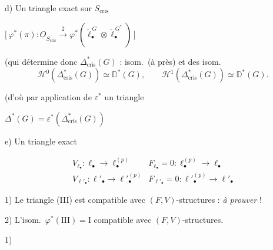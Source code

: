 \documentclass[11pt,a4paper]{article}
\begin{document}
d)  Un triangle exact sur $S_{\mathrm{cris}}$


\qquad
$\bigl[\,\varphi^*(\pi)\colon \underline{O}_{S_{\mathrm{cris}}} \xrightarrow{\ 2\ }
\varphi^*(\check{\ell}^{\,G}_\bullet \otimes \check{\ell}^{\,G^*}_\bullet)\,\bigr]$

(qui détermine donc $\Delta^*_{\mathrm{cris}}(G)$ : isom.\ (à  près) et des isom.
\[
\mathcal{H}^0(\Delta^*_{\mathrm{cris}}(G)) \simeq \mathbb{D}^*(G), \qquad
\mathcal{H}^1(\Delta^*_{\mathrm{cris}}(G)) \simeq \mathbb{D}^*(G) .
\]

(d'où par application de $\varepsilon^*$ un triangle


\qquad $\Delta^*(G) = \varepsilon^*(\Delta^*_{\mathrm{cris}}(G))$

e) Un triangle exact


\[
\begin{array}{ll}
V_{\ell_\bullet}\colon \ell_\bullet \to \ell^{(p)}_\bullet &
F_{\ell_\bullet} = 0\colon \ell^{(p)}_\bullet \to \ell_\bullet \\
V_{\ell'_\bullet}\colon \ell'_\bullet \to \ell'^{(p)}_\bullet &
F_{\ell'_\bullet} = 0\colon \ell'^{(p)}_\bullet \to \ell'_\bullet
\end{array}
\]

1) Le triangle (III) est compatible avec $(F,V)$-structures : \emph{à
prouver} !

2) L'isom.\ $\varphi^*(\mathrm{III}) = \mathrm{I}$ compatible avec
$(F,V)$-structures.

1) \struck{\ill{}}

\end{document}
